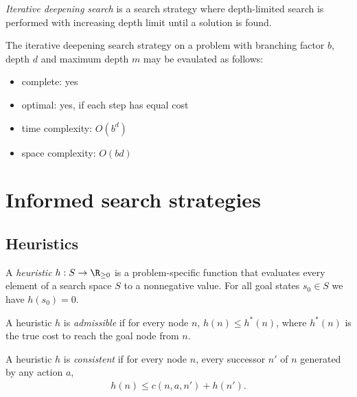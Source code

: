 \documentclass{article}
\begin{document}
\begin{definition}
    \emph{Iterative deepening search} is a search strategy where
    depth-limited search is performed with increasing depth limit until
    a solution is found.
\end{definition}

\begin{theorem}
    The iterative deepening search strategy on a problem with branching factor
    $b$, depth $d$ and maximum depth $m$ may be evaulated as follows:
    \begin{itemize}
        \item complete: yes
        \item optimal: yes, if each step has equal cost
        \item time complexity: $O(b^d)$
        \item space complexity: $O(bd)$
    \end{itemize}
\end{theorem}


\section{Informed search strategies}

\subsection{Heuristics}

\begin{definition}
    A \emph{heuristic} $h:S\to \R_{\geq 0}$ is a problem-specific function
    that evaluates every element of a search space $S$ to a nonnegative value.
    For all goal states $s_0\in S$ we have $h(s_0)=0$.
\end{definition}

\begin{definition}
    A heuristic $h$ is \emph{admissible} if for every node $n$, $h(n)\leq h^*(n)$,
    where $h^*(n)$ is the true cost to reach the goal node from $n$.
\end{definition}

\begin{definition}
    A heuristic $h$ is \emph{consistent} if for every node $n$, every
    successor $n'$ of $n$ generated by any action $a$,
    \begin{align*}
        h(n) \leq c(n, a, n') + h(n').
    \end{align*}
\end{definition}
\end{document}
